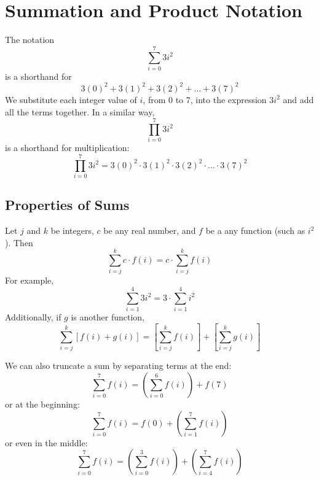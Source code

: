 \section{Summation and Product Notation}

The notation 
\begin{equation*}
    \sum_{i = 0}^7 3 i^2
\end{equation*}
is a shorthand for 
\begin{equation*}
    3 (0)^2 + 3(1)^2 + 3(2)^2 + \ldots + 3(7)^2
\end{equation*}
We substitute each integer value of $i$, from 0 to 7, into the expression  $3 i^2$ and add all the terms together. In a similar way, 
\begin{equation*}
    \prod_{i = 0}^7 3 i^2
\end{equation*}
is a shorthand for multiplication:
\begin{equation*}
    \prod_{i = 0}^7 3 i^2 = 3(0)^2 \cdot 3(1)^2 \cdot 3(2)^2 \cdot \ldots \cdot 3(7)^2
\end{equation*}

\subsection{Properties of Sums}

Let $j$ and $k$ be integers, $c$ be any real number, and $f$ be a any function (such as $i^2$). Then
\begin{equation*}
    \sum_{i = j}^k c \cdot f(i) = c \cdot \sum_{i = j}^k f(i)
\end{equation*}
For example,
\begin{equation*}
    \sum_{i = 1}^4 3 i^2 = 3 \cdot \sum_{i = 1}^4 i^2
\end{equation*}
Additionally, if $g$ is another function,
\begin{equation*}
    \sum_{i = j}^k [f(i) + g(i)] = \left[\sum_{i = j}^k f(i)\right] + \left[\sum_{i = j}^k g(i)\right]
\end{equation*}

We can also truncate a sum by separating terms at the end:
\begin{equation*}
    \sum_{i = 0}^7 f(i) = \left(\sum_{i = 0}^6 f(i)\right) + f(7)
\end{equation*}
or at the beginning:
\begin{equation*}
    \sum_{i = 0}^7 f(i) = f(0) + \left(\sum_{i = 1}^7 f(i)\right) 
\end{equation*}
or even in the middle:
\begin{equation*}
    \sum_{i = 0}^7 f(i) = \left(\sum_{i = 0}^3 f(i)\right) + \left(\sum_{i = 4}^7 f(i)\right) 
\end{equation*}


